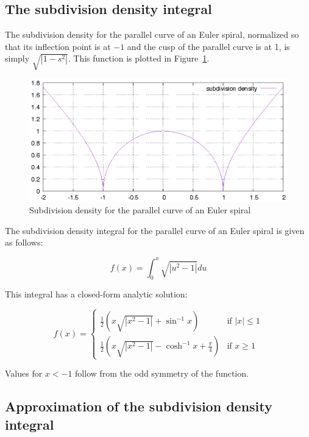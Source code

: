 \documentclass[sigconf, nonacm]{acmart}
\begin{document}
\subsection{The subdivision density integral} \label{subsection:subdiv-density-int}

The subdivision density for the parallel curve of an Euler spiral, normalized so that its inflection point is at $-1$ and the cusp of the parallel curve is at 1, is simply $\sqrt{|1-s^2|}$. This function is plotted in Figure~\ref{fig:subdiv_density}.

\begin{figure}
    \includegraphics[scale=0.6]{subdiv_density}
    \caption{Subdivision density for the parallel curve of an Euler spiral}
    \label{fig:subdiv_density}
\end{figure}

The subdivision density integral for the parallel curve of an Euler spiral is given as follows:

\[
    f(x) = \int_0^x\sqrt{|u^2 - 1|} du
\]

This integral has a closed-form analytic solution:

\[
    f(x) = \left\{
        \begin{array}{rl}
            \frac{1}{2}(x\sqrt{|x^2-1|} + \sin^{-1}x) & \text{if } |x| \leq 1 \\
            \frac{1}{2}(x\sqrt{|x^2-1|} - \cosh^{-1}x + \frac{\pi}{4}) & \text{if } x \geq 1
        \end{array}
    \right.
\]

Values for $x<-1$ follow from the odd symmetry of the function. 


\subsection{Approximation of the subdivision density integral}
\end{document}
